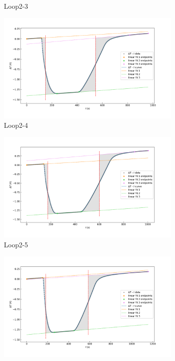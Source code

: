 \documentclass[cn,hazy,pku,12pt,normal,math=newtx,cite=super]{elegantnote}
\begin{document}
\begin{figure}[htbp]
\begin{subfigure}{0.45\textwidth}
        \caption*{Loop2-3}
    \end{subfigure}
    \hfill
    \begin{subfigure}{0.45\textwidth}
        \centering
        \includegraphics[width=\linewidth]{figures/3-4.png}
        \caption*{Loop2-4}
    \end{subfigure}
    \vspace{1em} %
    \begin{subfigure}{0.45\textwidth}
        \centering
        \includegraphics[width=\linewidth]{figures/3-5.png}
        \caption*{Loop2-5}
    \end{subfigure}
    \hfill
    \begin{subfigure}{0.45\textwidth}
        \centering
        \includegraphics[width=\linewidth]{figures/3-6.png}

\end{subfigure}
\end{figure}
\end{document}
